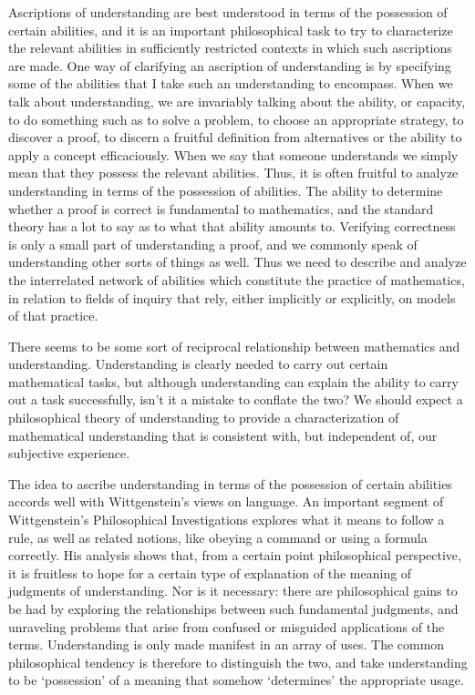 \documentclass{article}
\begin{document}
Ascriptions of understanding are best understood in terms of the possession of
certain abilities, and it is an important philosophical task to try to
characterize the relevant abilities in sufficiently restricted contexts in which
such ascriptions are made. One way of clarifying an ascription of understanding
is by specifying some of the abilities that I take such an understanding to
encompass. When we talk about understanding, we are invariably talking about
the ability, or capacity, to do something such as to solve a problem, to choose
an appropriate strategy, to discover a proof, to discern a fruitful definition
from alternatives or the ability to apply a concept efficaciously. When we say
that someone understands we simply mean that they possess the relevant
abilities. Thus, it is often fruitful to analyze understanding in terms of the
possession of abilities. The ability to determine whether a proof is correct
is fundamental to mathematics, and the standard theory has a lot to say as to
what that ability amounts to. Verifying correctness is only a small part of
understanding a proof, and we commonly speak of understanding other sorts of
things as well. Thus we need to describe and analyze the interrelated network
of abilities which constitute the practice of mathematics, in relation to fields
of inquiry that rely, either implicitly or explicitly, on models of that
practice.

There seems to be some sort of reciprocal relationship between mathematics and 
understanding. Understanding is clearly needed to carry out certain mathematical
tasks, but although understanding can explain the ability to carry out a task
successfully, isn't it a mistake to conflate the two? We should expect a
philosophical theory of understanding to provide a characterization of
mathematical understanding that is consistent with, but independent of, our
subjective experience.

The idea to ascribe understanding in terms of the possession of certain abilities
accords well with Wittgenstein's views on language. An important segment of
Wittgenstein's Philosophical Investigations explores what it means to follow
a rule, as well as related notions, like obeying a command or using a formula
correctly. His analysis shows that,
from a certain point philosophical perspective, it is fruitless to hope for a 
certain type of explanation of the meaning of judgments of understanding.
Nor is it necessary: there are philosophical gains to be had by exploring the
relationships between such fundamental judgments, and unraveling problems that
arise from confused or misguided applications of the terms. Understanding is
only made manifest in an array of uses. The common philosophical tendency is
therefore to distinguish the two, and take understanding to be `possession' of
a meaning that somehow `determines' the appropriate usage.
\end{document}
